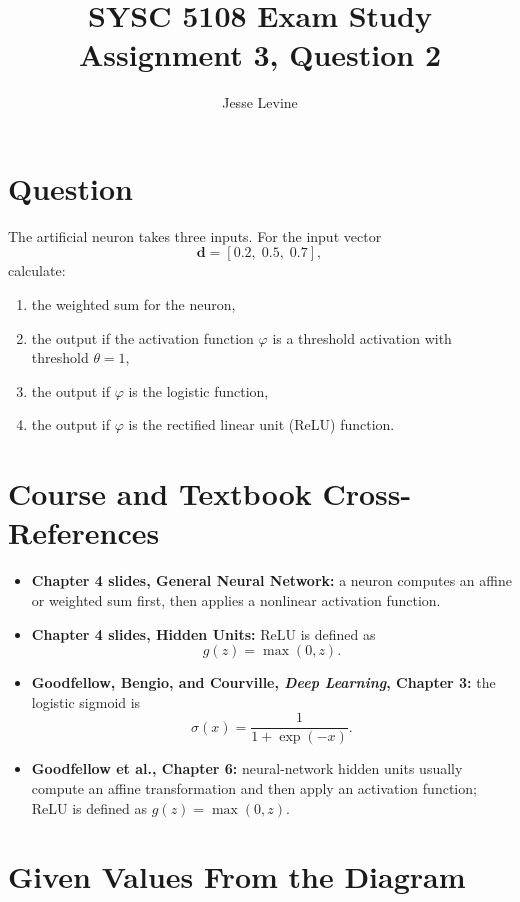 \documentclass[11pt]{article}
\title{SYSC 5108 Exam Study\\Assignment 3, Question 2}
\author{Jesse Levine}
\date{}
\begin{document}
\maketitle

\section*{Question}

The artificial neuron takes three inputs. For the input vector
\[
    \mathbf{d} = [0.2,\;0.5,\;0.7],
\]
calculate:

\begin{enumerate}[label=(\alph*)]
    \item the weighted sum for the neuron,
    \item the output if the activation function \(\varphi\) is a threshold
    activation with threshold \(\theta=1\),
    \item the output if \(\varphi\) is the logistic function,
    \item the output if \(\varphi\) is the rectified linear unit (ReLU) function.
\end{enumerate}

\section*{Course and Textbook Cross-References}

\begin{itemize}
    \item \textbf{Chapter 4 slides, General Neural Network:} a neuron computes
    an affine or weighted sum first, then applies a nonlinear activation function.
    \item \textbf{Chapter 4 slides, Hidden Units:} ReLU is defined as
    \[
        g(z)=\max(0,z).
    \]
    \item \textbf{Goodfellow, Bengio, and Courville, \emph{Deep Learning},
    Chapter 3:} the logistic sigmoid is
    \[
        \sigma(x)=\frac{1}{1+\exp(-x)}.
    \]
    \item \textbf{Goodfellow et al., Chapter 6:} neural-network hidden units
    usually compute an affine transformation and then apply an activation function;
    ReLU is defined as \(g(z)=\max(0,z)\).
\end{itemize}

\section*{Given Values From the Diagram}
\end{document}
